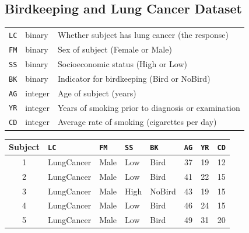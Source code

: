 \documentclass[oneside]{book}\usepackage[]{graphicx}\usepackage[svgnames]{xcolor}
\begin{document}
\subsection*{Birdkeeping and Lung Cancer Dataset}
\begin{table}[!htbp]
      \centering
      \begin{tabular}{lll}
            \texttt{LC} & binary  & Whether subject has lung cancer (the response)     \\
            \texttt{FM} & binary  & Sex of subject (Female or Male)                    \\
            \texttt{SS} & binary  & Socioeconomic status (High or Low)                 \\
            \texttt{BK} & binary  & Indicator for birdkeeping (Bird or NoBird)         \\
            \texttt{AG} & integer & Age of subject (years)                             \\
            \texttt{YR} & integer & Years of smoking prior to diagnosis or examination \\
            \texttt{CD} & integer & Average rate of smoking (cigarettes per day)
      \end{tabular}
      \begin{tabular}{cllllccc}
            \toprule
            Subject & \texttt{LC} & \texttt{FM} & \texttt{SS} & \texttt{BK} & \texttt{AG} & \texttt{YR} & \texttt{CD} \\
            \midrule
            1       & LungCancer  & Male        & Low         & Bird        & 37          & 19          & 12          \\
            2       & LungCancer  & Male        & Low         & Bird        & 41          & 22          & 15          \\
            3       & LungCancer  & Male        & High        & NoBird      & 43          & 19          & 15          \\
            4       & LungCancer  & Male        & Low         & Bird        & 46          & 24          & 15          \\
            5       & LungCancer  & Male        & Low         & Bird        & 49          & 31          & 20          \\
            \bottomrule
      \end{tabular}
\end{table}
\end{document}
